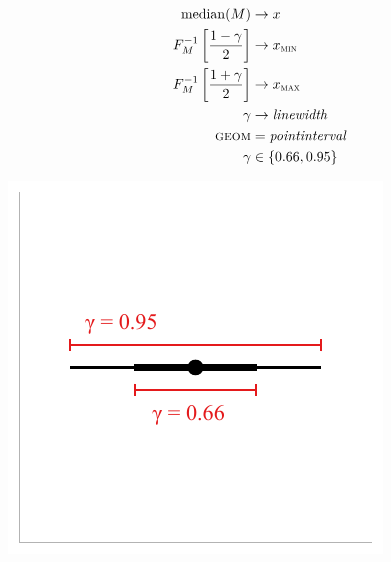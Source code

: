 \documentclass[journal]{vgtc}                     %
\begin{document}
\noindent
\begin{minipage}{.5\columnwidth}

\begin{align*}
\operatorname{median}(M) &\rightarrow x\\
F_M^{-1}\left[\frac{1 - \gamma}{2}\right] &\rightarrow x_\textsc{min}\\
F_M^{-1}\left[\frac{1 + \gamma}{2}\right] &\rightarrow x_\textsc{max}\\
\gamma &\rightarrow \mathit{linewidth}\\
\textsc{geom} &= \mathit{pointinterval}\\
\gamma &\in \{0.66, 0.95\}
\end{align*}
\end{minipage}%
  \begin{minipage}{.4\columnwidth}
    \centering
    \includegraphics[width=1.2\columnwidth]{figs/3-stat_pointinterval_linewidth.pdf}
  \end{minipage}
\hfill\break
\end{document}
